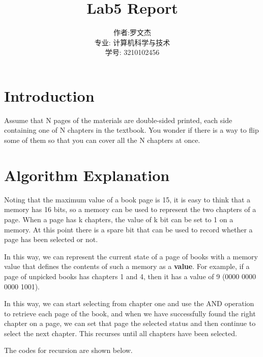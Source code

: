 \documentclass[20pt]{ctexart}
\title{Lab5 Report}
\author{作者:罗文杰\\专业: 计算机科学与技术\\学号: 3210102456}
\date{}
\begin{document}
\maketitle

\section{Introduction}
Assume that N pages of the materials are double-sided printed, each side
containing one of N chapters in the textbook. You wonder if there is a way to flip some of them so that
you can cover all the N chapters at once.

\section{Algorithm Explanation}
Noting that the maximum value of a book page is 15, it is easy to think that a memory has 16 bits, 
so a memory can be used to represent the two chapters of a page.
When a page has k chapters, the value of k bit can be set to 1 on a memory.
At this point there is a spare bit that can be used to record whether a page has been selected or not.

In this way, we can represent the current state of a page of books with a memory value that defines the contents of such a memory as a \textbf{value}.
For example, if a page of unpicked books has chapters 1 and 4, then it has a value of 9 (0000 0000 0000 1001).

In this way, we can start selecting from chapter one and use the AND operation to retrieve each page of the book, and when we have successfully found the right chapter on a page, 
we can set that page the selected status and then continue to select the next chapter. This recurses until all chapters have been selected.

The codes for recursion are shown below.
\end{document}
